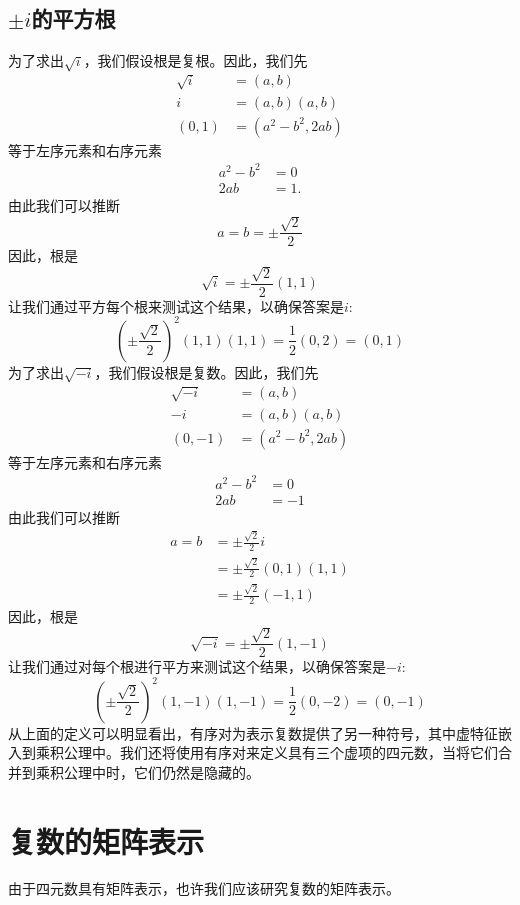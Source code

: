\subsection{\boldmath $\pm i$的平方根}
为了求出$\sqrt{i}$，我们假设根是复根。因此，我们先
$$
  \begin{aligned}
    \sqrt{i} & =(a, b)                          \\
    i        & =(a, b)(a, b)                    \\
    (0,1)    & =\left(a^{2}-b^{2}, 2 a b\right)
  \end{aligned}
$$
等于左序元素和右序元素
$$
  \begin{aligned}
    a^{2}-b^{2} & =0   \\
    2 a b       & =1 .
  \end{aligned}
$$
由此我们可以推断
$$
  a=b= \pm \frac{\sqrt{2}}{2}
$$
因此，根是
$$
  \sqrt{i}= \pm \frac{\sqrt{2}}{2}(1,1)
$$
让我们通过平方每个根来测试这个结果，以确保答案是$i$:
$$
  \left( \pm \frac{\sqrt{2}}{2}\right)^{2}(1,1)(1,1)=\frac{1}{2}(0,2)=(0,1)
$$
为了求出$\sqrt{-i}$，我们假设根是复数。因此，我们先
$$
  \begin{aligned}
    \sqrt{-i} & =(a, b)                          \\
    -i        & =(a, b)(a, b)                    \\
    (0,-1)    & =\left(a^{2}-b^{2}, 2 a b\right)
  \end{aligned}
$$
等于左序元素和右序元素
$$
  \begin{aligned}
    a^{2}-b^{2} & =0  \\
    2 a b       & =-1
  \end{aligned}
$$
由此我们可以推断
$$
  \begin{aligned}
    a=b & = \pm \frac{\sqrt{2}}{2} i         \\
        & = \pm \frac{\sqrt{2}}{2}(0,1)(1,1) \\
        & = \pm \frac{\sqrt{2}}{2}(-1,1)
  \end{aligned}
$$
因此，根是
$$
  \sqrt{-i}= \pm \frac{\sqrt{2}}{2}(1,-1)
$$
让我们通过对每个根进行平方来测试这个结果，以确保答案是$-i$:
$$
  \left( \pm \frac{\sqrt{2}}{2}\right)^{2}(1,-1)(1,-1)=\frac{1}{2}(0,-2)=(0,-1)
$$
从上面的定义可以明显看出，有序对为表示复数提供了另一种符号，其中虚特征嵌入到乘积公理中。我们还将使用有序对来定义具有三个虚项的四元数，当将它们合并到乘积公理中时，它们仍然是隐藏的。

\section{复数的矩阵表示}
由于四元数具有矩阵表示，也许我们应该研究复数的矩阵表示。

